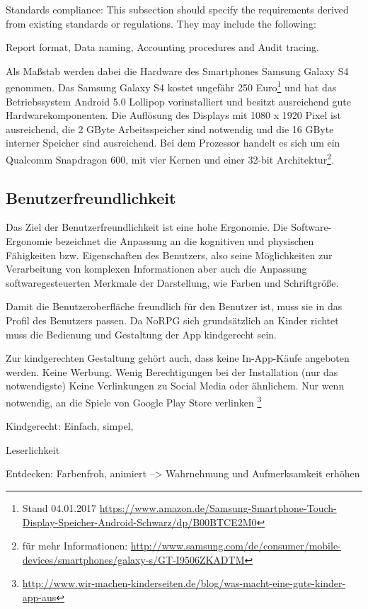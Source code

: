 {		Standards compliance: This subsection should specify the requirements derived from existing standards or regulations. They may include the following: 
		
		Report format, Data naming, Accounting procedures and Audit tracing.
		
		Als Maßstab werden dabei die Hardware des Smartphones Samsung Galaxy S4 genommen. Das Samsung Galaxy S4 kostet ungefähr 250 Euro\footnote{Stand 04.01.2017 \url{https://www.amazon.de/Samsung-Smartphone-Touch-Display-Speicher-Android-Schwarz/dp/B00BTCE2M0}} und hat das Betriebssystem Android 5.0 Lollipop vorinstalliert und besitzt ausreichend gute Hardwarekomponenten. Die Auflösung des Displays mit 1080 x 1920 Pixel ist ausreichend, die 2 GByte Arbeitsspeicher sind notwendig und die 16 GByte interner Speicher sind ausreichend. Bei dem Prozessor handelt es sich um ein Qualcomm Snapdragon 600, mit vier Kernen und einer 32-bit Architektur\footnote{für mehr Informationen: \url{http://www.samsung.com/de/consumer/mobile-devices/smartphones/galaxy-s/GT-I9506ZKADTM}}.
	
	\subsection{Benutzerfreundlichkeit}
		Das Ziel der Benutzerfreundlichkeit ist eine hohe Ergonomie. Die Software-Ergonomie bezeichnet die Anpassung an die kognitiven und physischen Fähigkeiten bzw. Eigenschaften des Benutzers, also seine Möglichkeiten zur Verarbeitung von komplexen Informationen aber auch die Anpassung softwaregesteuerten Merkmale der Darstellung, wie Farben und Schriftgröße.
		
		Damit die Benutzeroberfläche freundlich für den Benutzer ist, muss sie in das Profil des Benutzers passen. Da NoRPG sich grundsätzlich an Kinder richtet muss die Bedienung und Gestaltung der App kindgerecht sein. 
		
		Zur kindgerechten Gestaltung gehört auch, dass keine In-App-Käufe angeboten werden. Keine Werbung. Wenig Berechtigungen bei der Installation (nur das notwendigste)
		Keine Verlinkungen zu Social Media oder ähnlichem. Nur wenn notwendig, an die Spiele von Google Play Store verlinken \footnote{\url{http://www.wir-machen-kinderseiten.de/blog/was-macht-eine-gute-kinder-app-aus}}
		
		Kindgerecht: Einfach, simpel, 
		
		Leserlichkeit
		
		Entdecken: Farbenfroh, animiert --> Wahrnehmung und Aufmerksamkeit erhöhen
		
}
